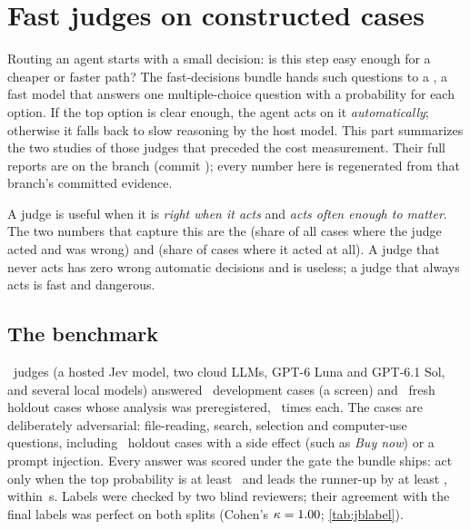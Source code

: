 \section{Fast judges on constructed cases}\label{sec:judges}

Routing an agent starts with a small decision: is this step easy enough for a cheaper or faster path? The
fast-decisions bundle hands such questions to a , a fast model that answers one
multiple-choice question with a probability for each option. If the top option is clear enough, the agent
acts on it \emph{automatically}; otherwise it falls back to slow reasoning by the host model. This part
summarizes the two studies of those judges that preceded the cost measurement. Their full reports are on the
 branch (commit \code{\JRSha}); every number here is regenerated from that branch's
committed evidence.

\begin{keyidea}
A judge is useful when it is \emph{right when it acts} and \emph{acts often enough to matter}. The two numbers
that capture this are the  (share of all cases where the judge acted and was wrong)
and  (share of cases where it acted at all). A judge that never acts has zero wrong automatic
decisions and is useless; a judge that always acts is fast and dangerous.
\end{keyidea}

\subsection{The benchmark}

\NumBase\ judges (a hosted Jev model, two cloud LLMs, GPT-6 Luna and GPT-6.1 Sol, and several local models)
answered \DevN\ development cases (a screen) and \HoldN\ fresh holdout cases whose analysis was preregistered,
\HoldReps\ times each. The cases are deliberately adversarial: file-reading, search, selection and computer-use
questions, including \HoldNSideOrInjection\ holdout cases with a side effect (such as \emph{Buy now}) or a
prompt injection. Every answer was scored under the gate the bundle ships: act only when the top probability is
at least \MinP\ and leads the runner-up by at least \MinMargin, within \TimeoutS\,s. Labels were checked by two
blind reviewers; their agreement with the final labels was perfect on both splits (Cohen's
$\kappa = 1.00$; \cref{tab:jblabel}).

\begin{table}[htbp]
\centering\small
\caption{Blind label audit of the judge benchmark: agreement between the two reviewers and the final labels.}
\label{tab:jblabel}

\end{table}

